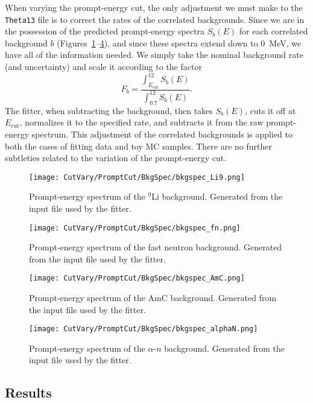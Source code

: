 \documentclass[../thesis.tex]{subfiles}
\begin{document}
When varying the prompt-energy cut, the only adjustment we must make to the \texttt{Theta13} file is to correct the rates of the correlated backgrounds. Since we are in the possession of the predicted prompt-energy spectra $S_b(E)$ for each correlated background $b$ (Figures~\ref{fig:bkgspec_Li9}--\ref{fig:bkgspec_alphaN}), and since these spectra extend down to 0~MeV, we have all of the information needed. We simply take the nominal background rate (and uncertainty) and scale it according to the factor
\begin{equation}
  F_b = \frac{\int_{E_{\mathrm{cut}}}^{12} S_b(E)}{\int_{0.7}^{12} S_b(E)}.
\end{equation}
The fitter, when subtracting the background, then takes $S_b(E)$, cuts it off at $E_{\mathrm{cut}}$, normalizes it to the specified rate, and subtracts it from the raw prompt-energy spectrum. This adjustment of the correlated backgrounds is applied to both the cases of fitting data and toy MC samples. There are no further subtleties related to the variation of the prompt-energy cut.

\begin{figure}[h]
  \texttt{[image: CutVary/PromptCut/BkgSpec/bkgspec\_Li9.png]}
  \caption{Prompt-energy spectrum of the $^9$Li background. Generated from the input file used by the fitter.}
  \label{fig:bkgspec_Li9}
\end{figure}

\begin{figure}[h]
  \texttt{[image: CutVary/PromptCut/BkgSpec/bkgspec\_fn.png]}
  \caption{Prompt-energy spectrum of the fast neutron background. Generated from the input file used by the fitter.}
  \label{fig:bkgspec_fn}
\end{figure}

\begin{figure}[h]
  \texttt{[image: CutVary/PromptCut/BkgSpec/bkgspec\_AmC.png]}
  \caption{Prompt-energy spectrum of the AmC background. Generated from the input file used by the fitter.}
  \label{fig:bkgspec_AmC}
\end{figure}

\begin{figure}[h]
  \texttt{[image: CutVary/PromptCut/BkgSpec/bkgspec\_alphaN.png]}
  \caption{Prompt-energy spectrum of the $\alpha$-$n$ background. Generated from the input file used by the fitter.}
  \label{fig:bkgspec_alphaN}
\end{figure}

\subsection{Results}
\label{sec:cutVaryPromptCutResults}
\end{document}
